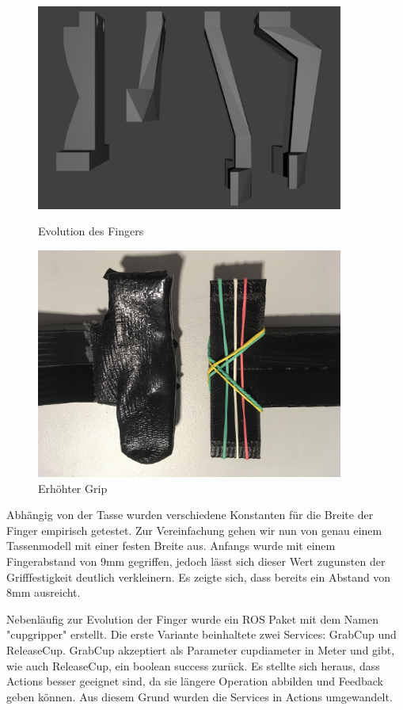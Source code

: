 \begin{figure}
    \centering
    \begin{minipage}{0.45\textwidth}
        \centering
        \includegraphics[width=0.9\textwidth]{images/finger_evolution.png} %
        \caption{Evolution des Fingers}
    \end{minipage}\hfill
    \begin{minipage}{0.45\textwidth}
        \centering
        \includegraphics[width=0.9\textwidth]{images/finger_tip.JPG} %
        \caption{Erhöhter Grip}
    \end{minipage}
\end{figure}

Abhängig von der Tasse wurden verschiedene Konstanten für die Breite der Finger empirisch getestet. Zur Vereinfachung gehen wir nun von genau einem Tassenmodell mit einer festen Breite aus. Anfangs wurde mit einem Fingerabstand von 9mm gegriffen, jedoch lässt sich dieser Wert zugunsten der Grifffestigkeit deutlich verkleinern. Es zeigte sich, dass bereits ein Abstand von 8mm ausreicht.

Nebenläufig zur Evolution der Finger wurde ein ROS Paket mit dem Namen "cup\textunderscore gripper" erstellt. Die erste Variante beinhaltete zwei Services: GrabCup und ReleaseCup. GrabCup akzeptiert als Parameter cup\textunderscore diameter in Meter und gibt, wie auch ReleaseCup, ein boolean success zurück. Es stellte sich heraus, dass Actions besser geeignet sind, da sie längere Operation abbilden und Feedback geben können. Aus diesem Grund wurden die Services in Actions umgewandelt.
